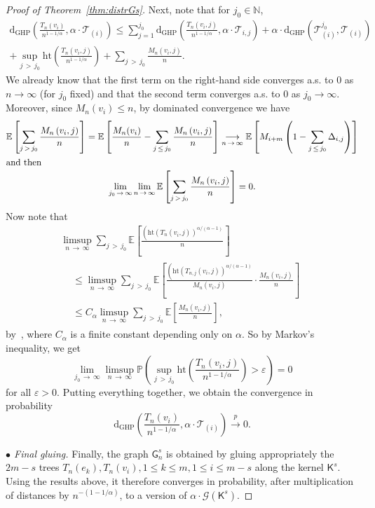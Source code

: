 \documentclass[AHL,Unicode,longabstracts,published]{cedram}
\newcommand{\convprob}{\ensuremath{\stackrel{p}{\rightarrow}}}
\newcommand{\GHP}{\mathrm{GHP}}
\newcommand{\rmd}{\mathrm{d}}
\newcommand{\htl}{\mathrm{ht}}
\newcommand{\cG}{\mathcal{G}}
\newcommand{\cT}{\mathcal{T}}
\newcommand{\sG}{\mathsf{G}}
\newcommand{\sK}{\mathsf{K}}
\newcommand{\N}{\mathbb{N}}
\newcommand{\bbE}{\mathbb{E}}
\newcommand{\bbP}{\mathbb{P}}
\begin{document}
\begin{proof}[Proof of Theorem~\ref{thm:distrGs}]
Next, note that for $j_0 \in \N$,
\begin{multline*}
\rmd_{\GHP}\left(\frac{T_n(v_i)}{n^{1-1/\alpha}},\alpha \cdot \cT_{(i)} \right) \leq \sum_{j=1}^{j_0} \rmd_{\GHP}\left(\frac{T_n\left(v_{i}, j\right)}{n^{1-1/\alpha}},\alpha \cdot \cT_{i,j} \right) +\alpha \cdot \rmd_{\GHP}\left(\cT_{(i)}^{j_0},\cT_{(i)} \right) \\
+\sup_{j\,>\,j_0} \htl\left(\frac{T_n\left(v_{i}, j\right)}{n^{1-1/\alpha}}\right) + \sum_{j\,>\,j_0} \frac{M_n\left(v_{i},j\right)}{n}.
\end{multline*}
We already know that the first term on the right-hand side converges a.s. to 0 as $n \rightarrow \infty$ (for $j_0$ fixed) and that the second term converges a.s. to 0 as $j_0 \rightarrow \infty$. Moreover, since $M_n(v_i) \le n$, by dominated convergence we have
\begin{gather*}
\bbE\left[\sum_{j\,>\,j_0} \frac{M_n\left(v_{i},j\right)}{n}\right] =\bbE\left[\frac{M_n(v_i)}{n}-\sum_{j\,\leq\,j_0} \frac{M_n\left(v_{i},j\right)}{n}\right] \underset{n\,\rightarrow\,\infty}\longrightarrow \bbE\left[M_{i+m}\left(1- \sum_{j\,\leq\,j_0} \Delta_{i,j}\right)\right]
\\
\intertext{and then}
\lim_{j_0\,\rightarrow\,\infty} \lim_{n\,\rightarrow \,\infty} \bbE\left[\sum_{j\,>\,j_0} \frac{M_n\left(v_{i},j\right)}{n}\right] =0.
\end{gather*}
Now note that
\begin{multline*}
\limsup_{n\,\rightarrow\,\infty} \sum_{j\,>\,j_0}\bbE\left[\frac{\left(\htl\left(T_{n}\left(v_{i},j\right)\right)^{\alpha/(\alpha-1)}\right.}{n}\right]\\
\begin{aligned}
& \leq \limsup_{n\,\rightarrow\,\infty} \sum_{j\,> \,j_0} \bbE\left[\frac{\left(\htl\left(T_{n,j}\left(v_{i},j\right)\right)^{\alpha/(\alpha-1)}\right.}{M_{n}\left(v_{i},j\right)} \cdot \frac{M_{n}\left(v_{i},j\right)}{n} \right] \\
&\underset{}\leq C_{\alpha} \limsup_{n\,\rightarrow\,\infty} \sum_{j\,>\,j_0} \bbE\left[\frac{M_{n}(v_{i},j)}{n} \right],
\end{aligned}
\end{multline*}
by~\cite[Lemma~33]{HaasMiermont}, where $C_{\alpha}$ is a finite constant depending only on $\alpha$. So by Markov's inequality, we get
\[
\lim_{j_0\,\rightarrow\,\infty} \limsup_{n \,\rightarrow\,\infty}\bbP\left(\sup_{j\,>\,j_0} \htl\left(\frac{T_n\left(v_{i},j\right)}{n^{1-1/\alpha}}\right)>\varepsilon\right)=0
\]
for all $\varepsilon>0$. Putting everything together, we obtain the convergence in probability
\[
\rmd_{\GHP}\left(\frac{T_n(v_i)}{n^{1-1/\alpha}},\alpha \cdot \cT_{(i)} \right) \convprob 0.
\]

\emph{$\bullet$ Final gluing.} Finally, the graph $\sG_n^s$ is obtained by gluing appropriately the $2m-s$ trees $T_n(e_k), T_n(v_{i}), 1 \leq k \leq m, 1 \leq i \leq m-s$ along the kernel $\sK^s$. Using the results above, it therefore converges in probability, after multiplication of distances by $n^{-(1-1/\alpha)}$, to a version of $\alpha \cdot \cG(\sK^s)$.
\end{proof}
\end{document}
